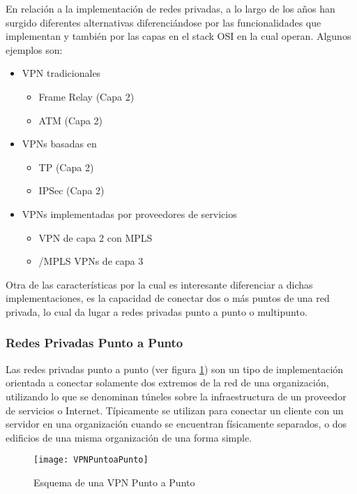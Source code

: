 En relaci\'on a la implementaci\'on de redes privadas, a lo largo de los años han surgido diferentes alternativas diferenciándose por las funcionalidades que implementan y tambi\'en por las capas en el stack OSI en la cual operan. Algunos ejemplos son: 

\begin{itemize}
\item VPN tradicionales
	\begin{itemize}
	\item Frame Relay (Capa 2)	
	\item ATM (Capa 2)
	\end{itemize}
	
\item VPNs basadas en 
	\begin{itemize}
	\item {}TP (Capa 2)
	\item IPSec (Capa 2)
	\end{itemize}
	
\item VPNs implementadas por proveedores de servicios
	\begin{itemize}
	\item VPN de capa 2 con MPLS
	\item {}/MPLS VPNs de capa 3
	\end{itemize}
\end{itemize}

Otra de las características por la cual es interesante diferenciar a dichas implementaciones, es la capacidad de conectar dos o m\'as puntos de una red privada, lo cual da lugar a redes privadas punto a punto o multipunto.

\subsubsection{Redes Privadas Punto a Punto}

Las redes privadas punto a punto (ver figura \ref{fig:VPNPuntoAPunto}) son un tipo de implementaci\'on orientada a conectar solamente dos extremos de la red de una organizaci\'on, utilizando lo que se denominan t\'uneles sobre la infraestructura de un proveedor de servicios o Internet. T\'ipicamente se utilizan para conectar un cliente con un servidor en una organizaci\'on cuando se encuentran f\'isicamente separados, o dos edificios de una misma organizaci\'on de una forma simple. 

\begin{figure}[htbp!] 
\centering    
\texttt{[image: VPNPuntoaPunto]}
\caption[Esquema de una VPN Punto a Punto]{Esquema de una VPN Punto a Punto}
\label{fig:VPNPuntoAPunto}
\end{figure}

